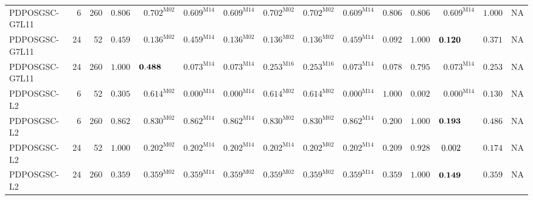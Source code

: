 \begin{longtable}{@{}lrrrrrrrrrrrrrr@{}}
PDPOSGSC-G7L11 & 6 & 260 & $\mathbf{0.806}$ & $\mathbf{0.702}^{\mathrm{M02}}$ & $\mathbf{0.609}^{\mathrm{M14}}$ & $\mathbf{0.609}^{\mathrm{M14}}$ & $\mathbf{0.702}^{\mathrm{M02}}$ & $\mathbf{0.702}^{\mathrm{M02}}$ & $\mathbf{0.609}^{\mathrm{M14}}$ & $\mathbf{0.806}$ & $\mathbf{0.806}$ & $\mathbf{0.609}^{\mathrm{M14}}$ & $\mathbf{1.000}$ & \textsc{NA} \\
PDPOSGSC-G7L11 & 24 & 52 & $\mathbf{0.459}$ & $\mathbf{0.136}^{\mathrm{M02}}$ & $\mathbf{0.459}^{\mathrm{M14}}$ & $\mathbf{0.136}^{\mathrm{M02}}$ & $\mathbf{0.136}^{\mathrm{M02}}$ & $\mathbf{0.136}^{\mathrm{M02}}$ & $\mathbf{0.459}^{\mathrm{M14}}$ & $0.092$ & $\mathbf{1.000}$ & $\mathbf{0.120}\hphantom{^{\mathrm{M00}}}$ & $\mathbf{0.371}$ & \textsc{NA} \\
PDPOSGSC-G7L11 & 24 & 260 & $\mathbf{1.000}$ & $\mathbf{0.488}\hphantom{^{\mathrm{M00}}}$ & $0.073^{\mathrm{M14}}$ & $0.073^{\mathrm{M14}}$ & $\mathbf{0.253}^{\mathrm{M16}}$ & $\mathbf{0.253}^{\mathrm{M16}}$ & $0.073^{\mathrm{M14}}$ & $0.078$ & $\mathbf{0.795}$ & $0.073^{\mathrm{M14}}$ & $\mathbf{0.253}$ & \textsc{NA} \\
PDPOSGSC-L2 & 6 & 52 & $\mathbf{0.305}$ & $\mathbf{0.614}^{\mathrm{M02}}$ & $0.000^{\mathrm{M14}}$ & $0.000^{\mathrm{M14}}$ & $\mathbf{0.614}^{\mathrm{M02}}$ & $\mathbf{0.614}^{\mathrm{M02}}$ & $0.000^{\mathrm{M14}}$ & $\mathbf{1.000}$ & $0.002$ & $0.000^{\mathrm{M14}}$ & $\mathbf{0.130}$ & \textsc{NA} \\
PDPOSGSC-L2 & 6 & 260 & $\mathbf{0.862}$ & $\mathbf{0.830}^{\mathrm{M02}}$ & $\mathbf{0.862}^{\mathrm{M14}}$ & $\mathbf{0.862}^{\mathrm{M14}}$ & $\mathbf{0.830}^{\mathrm{M02}}$ & $\mathbf{0.830}^{\mathrm{M02}}$ & $\mathbf{0.862}^{\mathrm{M14}}$ & $\mathbf{0.200}$ & $\mathbf{1.000}$ & $\mathbf{0.193}\hphantom{^{\mathrm{M00}}}$ & $\mathbf{0.486}$ & \textsc{NA} \\
PDPOSGSC-L2 & 24 & 52 & $\mathbf{1.000}$ & $\mathbf{0.202}^{\mathrm{M02}}$ & $\mathbf{0.202}^{\mathrm{M14}}$ & $\mathbf{0.202}^{\mathrm{M14}}$ & $\mathbf{0.202}^{\mathrm{M14}}$ & $\mathbf{0.202}^{\mathrm{M02}}$ & $\mathbf{0.202}^{\mathrm{M14}}$ & $\mathbf{0.209}$ & $\mathbf{0.928}$ & $0.002\hphantom{^{\mathrm{M00}}}$ & $\mathbf{0.174}$ & \textsc{NA} \\
PDPOSGSC-L2 & 24 & 260 & $\mathbf{0.359}$ & $\mathbf{0.359}^{\mathrm{M02}}$ & $\mathbf{0.359}^{\mathrm{M14}}$ & $\mathbf{0.359}^{\mathrm{M02}}$ & $\mathbf{0.359}^{\mathrm{M02}}$ & $\mathbf{0.359}^{\mathrm{M02}}$ & $\mathbf{0.359}^{\mathrm{M14}}$ & $\mathbf{0.359}$ & $\mathbf{1.000}$ & $\mathbf{0.149}\hphantom{^{\mathrm{M00}}}$ & $\mathbf{0.359}$ & \textsc{NA} \\

\end{longtable}
